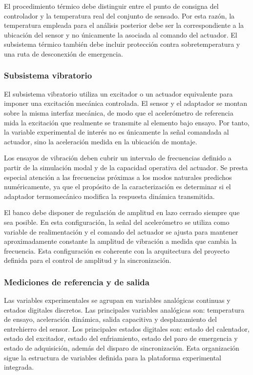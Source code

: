 \documentclass[conference]{IEEEtran}
\begin{document}
El procedimiento térmico debe distinguir entre el punto de consigna del controlador y la temperatura real del conjunto de sensado. Por esta razón, la temperatura empleada para el análisis posterior debe ser la correspondiente a la ubicación del sensor y no únicamente la asociada al comando del actuador. El subsistema térmico también debe incluir protección contra sobretemperatura y una ruta de desconexión de emergencia.

\subsubsection{Subsistema vibratorio}

El subsistema vibratorio utiliza un excitador o un actuador equivalente para imponer una excitación mecánica controlada. El sensor y el adaptador se montan sobre la misma interfaz mecánica, de modo que el acelerómetro de referencia mida la excitación que realmente se transmite al elemento bajo ensayo. Por tanto, la variable experimental de interés no es únicamente la señal comandada al actuador, sino la aceleración medida en la ubicación de montaje.

Los ensayos de vibración deben cubrir un intervalo de frecuencias definido a partir de la simulación modal y de la capacidad operativa del actuador. Se presta especial atención a las frecuencias próximas a los modos naturales predichos numéricamente, ya que el propósito de la caracterización es determinar si el adaptador termomecánico modifica la respuesta dinámica transmitida.

El banco debe disponer de regulación de amplitud en lazo cerrado siempre que sea posible. En esta configuración, la señal del acelerómetro se utiliza como variable de realimentación y el comando del actuador se ajusta para mantener aproximadamente constante la amplitud de vibración a medida que cambia la frecuencia. Esta configuración es coherente con la arquitectura del proyecto definida para el control de amplitud y la sincronización.

\subsubsection{Mediciones de referencia y de salida}

Las variables experimentales se agrupan en variables analógicas continuas y estados digitales discretos. Las principales variables analógicas son: temperatura de ensayo, aceleración dinámica, salida capacitiva y desplazamiento del entrehierro del sensor. Los principales estados digitales son: estado del calentador, estado del excitador, estado del enfriamiento, estado del paro de emergencia y estado de adquisición, además del disparo de sincronización. Esta organización sigue la estructura de variables definida para la plataforma experimental integrada.
\end{document}
